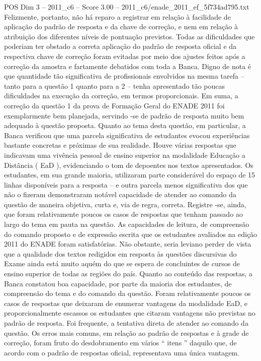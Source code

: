 \begin{textsample}{POS Dim 3 – 2011\_c6 – Score 3.00 – 2011\_c6/enade\_2011\_ef\_5f734ad795.txt}
Felizmente, portanto, não há reparo a registrar em relação à facilidade de aplicação do padrão de resposta e da chave de correção, e nem em relação à atribuição dos diferentes níveis de pontuação previstos.
Todas as dificuldades que poderiam ter obstado a correta aplicação do padrão de resposta oficial e da respectiva chave de correção foram evitadas por meio dos ajustes feitos após a correção da amostra e fartamente debatidos com toda a Banca.
Digno de nota é que quantidade tão significativa de profissionais envolvidos na mesma tarefa – tanto para a questão 1 quanto para a 2 – tenha apresentado tão poucas dificuldades na execução da correção, em termos proporcionais.
Em suma, a correção da questão 1 da prova de Formação Geral do ENADE 2011 foi exemplarmente bem planejada, servindo -se de padrão de resposta muito bem adequado à questão proposta.
Quanto ao tema desta questão, em particular, a Banca verificou que uma parcela significativa de estudantes evocou experiências bastante concretas e próximas de sua realidade.
Houve várias respostas que indicavam uma vivência pessoal de ensino superior na modalidade Educação a Distância ( EaD ), evidenciando o tom de depoentes nos textos apresentados.
Os estudantes, em sua grande maioria, utilizaram parte considerável do espaço de 15 linhas disponíveis para a resposta – e outra parcela menos significativa dos que não o fizeram demonstraram notável capacidade de atender ao comando da questão de maneira objetiva, curta e, via de regra, correta.
Registre -se, ainda, que foram relativamente poucos os casos de respostas que tenham passado ao largo do tema em pauta na questão.
As capacidades de leitura, de compreensão do comando proposto e de expressão escrita que os estudantes avaliados na edição 2011 do ENADE foram satisfatórias.
Não obstante, seria leviano perder de vista que a qualidade dos textos redigidos em resposta às questões discursivas do Exame ainda está muito aquém do que se espera de concluintes de cursos de ensino superior de todas as regiões do país.
Quanto ao conteúdo das respostas, a Banca constatou boa capacidade, por parte da maioria dos estudantes, de compreensão do tema e do comando da questão.
Foram relativamente poucos os casos de respostas que deixaram de enumerar vantagens da modalidade EaD, e proporcionalmente escassos os estudantes que citaram vantagens não previstas no padrão de resposta.
Foi frequente, a tentativa direta de atender ao comando da questão.
Os erros mais comuns, em relação ao padrão de respostas e à grade de correção, foram fruto do desdobramento em vários “ itens ” daquilo que, de acordo com o padrão de respostas oficial, representava uma única vantagem.

\end{textsample}
